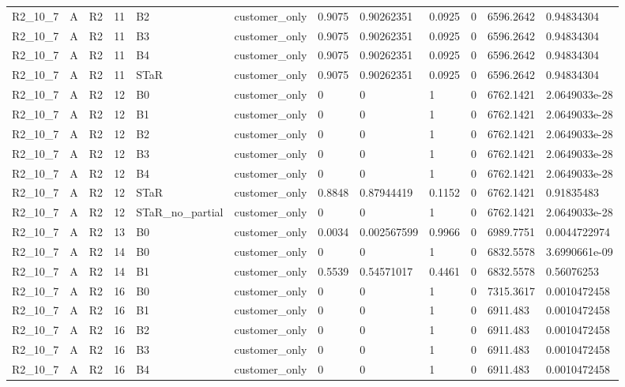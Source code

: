 \begin{longtable}{llllllllllll}
R2\_10\_7 & A & R2 & 11 & B2 & customer\_only & 0.9075 & 0.90262351 & 0.0925 & 0 & 6596.2642 & 0.94834304 \\
R2\_10\_7 & A & R2 & 11 & B3 & customer\_only & 0.9075 & 0.90262351 & 0.0925 & 0 & 6596.2642 & 0.94834304 \\
R2\_10\_7 & A & R2 & 11 & B4 & customer\_only & 0.9075 & 0.90262351 & 0.0925 & 0 & 6596.2642 & 0.94834304 \\
R2\_10\_7 & A & R2 & 11 & STaR & customer\_only & 0.9075 & 0.90262351 & 0.0925 & 0 & 6596.2642 & 0.94834304 \\
R2\_10\_7 & A & R2 & 12 & B0 & customer\_only & 0 & 0 & 1 & 0 & 6762.1421 & 2.0649033e-28 \\
R2\_10\_7 & A & R2 & 12 & B1 & customer\_only & 0 & 0 & 1 & 0 & 6762.1421 & 2.0649033e-28 \\
R2\_10\_7 & A & R2 & 12 & B2 & customer\_only & 0 & 0 & 1 & 0 & 6762.1421 & 2.0649033e-28 \\
R2\_10\_7 & A & R2 & 12 & B3 & customer\_only & 0 & 0 & 1 & 0 & 6762.1421 & 2.0649033e-28 \\
R2\_10\_7 & A & R2 & 12 & B4 & customer\_only & 0 & 0 & 1 & 0 & 6762.1421 & 2.0649033e-28 \\
R2\_10\_7 & A & R2 & 12 & STaR & customer\_only & 0.8848 & 0.87944419 & 0.1152 & 0 & 6762.1421 & 0.91835483 \\
R2\_10\_7 & A & R2 & 12 & STaR\_no\_partial & customer\_only & 0 & 0 & 1 & 0 & 6762.1421 & 2.0649033e-28 \\
R2\_10\_7 & A & R2 & 13 & B0 & customer\_only & 0.0034 & 0.002567599 & 0.9966 & 0 & 6989.7751 & 0.0044722974 \\
R2\_10\_7 & A & R2 & 14 & B0 & customer\_only & 0 & 0 & 1 & 0 & 6832.5578 & 3.6990661e-09 \\
R2\_10\_7 & A & R2 & 14 & B1 & customer\_only & 0.5539 & 0.54571017 & 0.4461 & 0 & 6832.5578 & 0.56076253 \\
R2\_10\_7 & A & R2 & 16 & B0 & customer\_only & 0 & 0 & 1 & 0 & 7315.3617 & 0.0010472458 \\
R2\_10\_7 & A & R2 & 16 & B1 & customer\_only & 0 & 0 & 1 & 0 & 6911.483 & 0.0010472458 \\
R2\_10\_7 & A & R2 & 16 & B2 & customer\_only & 0 & 0 & 1 & 0 & 6911.483 & 0.0010472458 \\
R2\_10\_7 & A & R2 & 16 & B3 & customer\_only & 0 & 0 & 1 & 0 & 6911.483 & 0.0010472458 \\
R2\_10\_7 & A & R2 & 16 & B4 & customer\_only & 0 & 0 & 1 & 0 & 6911.483 & 0.0010472458 \\

\end{longtable}

